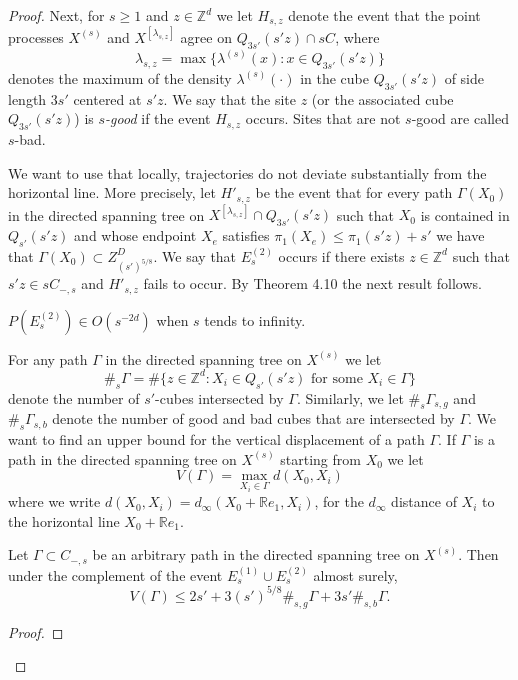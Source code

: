 \begin{proof}
Next, for $s\geq 1$ and $z\in \mathbb{Z}^{d}$ we let $H_{s,z}$ denote the event that the point processes $X^{(s)}$ and $X^{[\lambda_{s,z}]}$ agree on $Q_{3s'}(s'z)\cap sC$, where $$\lambda_{s,z}=\max\lbrace \lambda^{(s)}(x): x\in Q_{3s'}(s'z)\rbrace $$ denotes the maximum of the density $\lambda^{(s)}(\cdot)$ in the cube $Q_{3s'}(s'z)$ of side length $3s'$ centered at $s'z$. We say that the site $z$ (or the associated cube $Q_{3s'}(s'z)$) is \textit{$s$-good} if the event $H_{s,z}$ occurs. Sites that are not $s$-good are called $s$-bad.

We want to use that locally, trajectories do not deviate substantially from the horizontal line. More precisely, let $H'_{s,z}$ be the event that for every path $\Gamma (X_0)$ in the directed spanning tree on $X^{[\lambda_{s,z}]}\cap Q_{3s'}(s'z)$ such that $X_0$ is contained in $Q_{s'}(s'z)$ and whose endpoint $X_e$ satisfies $\pi_1(X_e)\leq \pi_1(s'z)+s'$ we have that $\Gamma(X_0)\subset Z^D_{(s')^{5/8}}$. We say that $E_s^{(2)}$ occurs if there exists $z\in \mathbb{Z}^d$ such that $s'z\in sC_{-,s}$ and $H'_{s,z}$ fails to occur. By \cite{Bac} Theorem 4.10 the next result follows.

\begin{lem} \label{lem2.7}
$P(E^{(2)}_s)\in O(s^{-2d})$ when $s$ tends to infinity.

\end{lem}

For any path $\Gamma$ in the directed spanning tree on $X^{(s)}$ we let
$$\#_s\Gamma=\#\lbrace z\in \mathbb{Z}^d: X_i\in Q_{s'}(s'z)\mbox{ for some }X_i \in \Gamma\rbrace $$ denote the number of $s'$-cubes intersected by $\Gamma$. Similarly, we let $\#_s\Gamma_{s,g}$ and $\#_s\Gamma_{s,b}$ denote the number of good and bad cubes that are intersected by $\Gamma$. We want to find an upper bound for the vertical displacement of a path $\Gamma$. If $\Gamma$ is a path in the directed spanning tree on $X^{(s)}$ starting from $X_0$ we let $$V(\Gamma)=\max_{X_i\in\Gamma}d(X_0, X_i) $$ where we write $d(X_0, X_i)=d_{\infty}(X_0+\mathbb{R}e_1, X_i)$, for the $d_\infty$ distance of $X_i$ to the horizontal line $X_0+\mathbb{R}e_1$.

\begin{lem}\label{lem2.8} Let $\Gamma\subset C_{-,s}$ be an arbitrary path in the directed spanning tree on $X^{(s)}$. Then  under the complement of the event $E^{(1)}_s\cup E^{(2)}_s$ almost surely, $$V(\Gamma)\leq 2s'+3(s')^{5/8}\#_{s,g}\Gamma+3s'\#_{s,b}\Gamma. $$
\end{lem}
\begin{proof}



\end{proof}
\end{proof}
